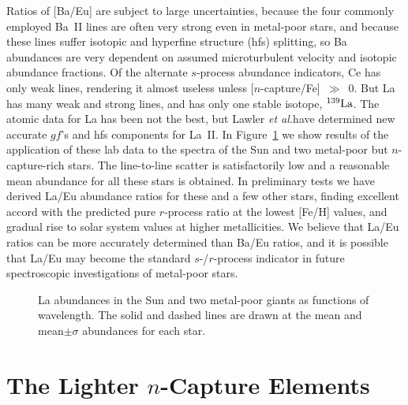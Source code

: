                                                                                                                                                                                                                                                                                                                                                                                                                                                                                                                                                                                                                                                                                                                                                                                                                                                                                                                                                                                                                                                                                                                                                                                                                                                                                                                                                                                                                                                                                                                                                                                                                                                                                                                                                                                                                                                                                                                                                                                                                                                                                                                                                                                                                                                                                                                                                                                                                                                                                                                                                                                                                                                                                                                                                                                                                                                                                                                                                                                                                                                                                                                                                                                                                                                                                                                                                                                                                                                                                                                                                                                                                                                                                                                                                                                                                                                                                                                                                                                                                                                                                                                                                                                                                                                                                                                                                                                                                                                                                                                                                                                                                                                                                                                                                                                                                                                                                                                                                                                                                                                                                                                                                                                                                                                                                                                                                                                                                                                                                                                                                                                                                                                                                                                                                                                                                                                                                                                                                                                                                                                                                                                                                                                                                                                                                                                                                                                                                                                                                                                                                                                                                                                                                                                                                                                                                                                                                                                                                                                                                                                                                                                                                                                                                                                                                                                                                                                                                                                                                                                                                                                                                                                                                                                                                                                                                                                                                                                                                                                                                                                                                                                                                                                                                                                                                                                                                                                                                                                                                                                                                                                                                                                                                                                                                                                                                                                                                                                                                                                                                                                                                                                                                                                                                                                                                                                                                                                                                                                                                                                                                                                                                                                                                                                                                                                                                                                                                                                                                                                                                                                                                                                                                                                                                                                                                                                                                                                                                                                                                                                                                                                                                                                                                                                                                                                                                                                                                                                                                                                                                                                                                                                                                                                                                                                                                                                                                                                                                                                                                                                                                                                                                                                                                                                                                                                                                                                                                                                                                                                                                                                                                                                                                                                                                                                                                                                                                                                                                                                                                                                                                                                                                                                                                                                                                                                                                                                                                                                                                                                                                                                                                                                                                                                                                                                                                                                                                                                                                                                                                                                                                                                                                                                                                                                                                                                                                                                                                                                                                                                                                                                                                                                                                                                                                                                                                                                                                                                                                                                                                                                                                                                                                                                                                                                                                                                                                                                                                                                                                                                                                                                                                                                                                                                                                                                                                                                                                                                                                                                                                                                                                                                                                                                                                                                                                                                            \documentclass{ws-p8-50x6-00}
\begin{document}
Ratios of [Ba/Eu] are subject to large uncertainties, because the four
commonly employed Ba~II lines are often very strong even in metal-poor stars, 
and because these lines suffer isotopic and hyperfine structure (hfs) 
splitting, so Ba abundances are very dependent on assumed microturbulent 
velocity and isotopic abundance fractions.  
Of the alternate $s$-process abundance indicators, Ce has only weak lines, 
rendering it almost useless unless [$n$-capture/Fe]~$\gg$~0.  
But La has many weak and strong lines, and has only one stable
isotope, $^{139}\rm {La}$.  
The atomic data for La has been not the best, but Lawler 
{\it et al.}\cite{La00}have determined new accurate $gf$'s and hfs 
components for La~II.  
In Figure~\ref{lasummary2} we show results of the application of 
these lab data to the spectra of the Sun and two metal-poor but 
$n$-capture-rich stars.  
The line-to-line scatter is satisfactorily low and a reasonable mean 
abundance for all these stars is obtained.  
In preliminary tests we have derived La/Eu abundance ratios for these 
and a few other stars, finding excellent accord with the predicted pure
$r$-process ratio at the lowest [Fe/H] values, and gradual rise to solar
system values at higher metallicities.  
We believe that La/Eu ratios can be more accurately determined than 
Ba/Eu ratios, and it is possible that La/Eu may become the standard  
$s$-/$r$-process indicator in future spectroscopic investigations 
of metal-poor stars.
 
\begin{figure}[t]
\epsfxsize=20pc \hspace*{0.5in}
 \caption{La abundances in the Sun and two metal-poor giants as functions
of wavelength.
The solid and dashed lines are drawn at the mean and mean$\pm\sigma$
abundances for each star.
\label{lasummary2}}
\end{figure}







\section{The Lighter $n$-Capture Elements}
 
\end{document}
